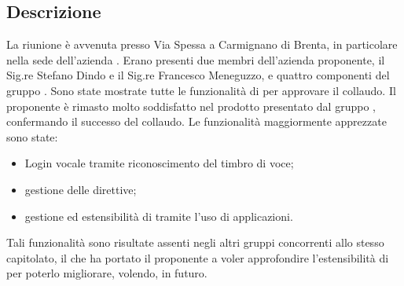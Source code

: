 \documentclass[a4paper,titlepage]{article}
\begin{document}
		\subsection{Descrizione}
		La riunione è avvenuta presso Via Spessa a Carmignano di Brenta, in particolare nella sede dell'azienda \PROPONENTE. Erano presenti due membri dell'azienda proponente, il Sig.re Stefano Dindo e il Sig.re Francesco Meneguzzo, e quattro componenti del gruppo \GRUPPO{}. Sono state mostrate tutte le funzionalità di \PROGETTO{} per approvare il collaudo.
Il proponente \PROPONENTE{} è rimasto molto soddisfatto nel prodotto presentato dal gruppo \GRUPPO{}, confermando il successo del collaudo.
Le funzionalità maggiormente apprezzate sono state:
\begin{itemize}
	\item Login vocale tramite riconoscimento del timbro di voce;
	\item gestione delle direttive;
	\item gestione ed estensibilità di \PROGETTO{} tramite l'uso di applicazioni.
\end{itemize}
Tali funzionalità sono risultate assenti negli altri gruppi concorrenti allo stesso capitolato, il che ha portato il proponente \PROPONENTE{} a voler approfondire l'estensibilità di \PROGETTO{} per poterlo migliorare, volendo, in futuro.

		
	
\end{document}
